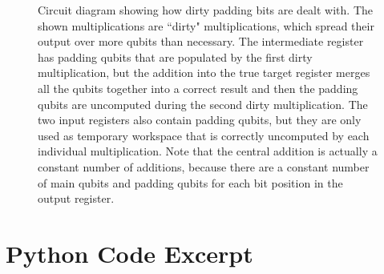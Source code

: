 \documentclass[onecolumn,unpublished]{quantumarticle}
\begin{document}
\begin{figure}
\centering
{}
    \caption{
        Circuit diagram showing how dirty padding bits are dealt with.
        The shown multiplications are ``dirty" multiplications, which spread their output over more qubits than necessary.
        The intermediate register has padding qubits that are populated by the first dirty multiplication, but the addition into the true target register merges all the qubits together into a correct result and then the padding qubits are uncomputed during the second dirty multiplication.
        The two input registers also contain padding qubits, but they are only used as temporary workspace that is correctly uncomputed by each individual multiplication.
        Note that the central addition is actually a constant number of additions, because there are a constant number of main qubits and padding qubits for each bit position in the output register.
    }
    \label{fig:padding}
\end{figure}

\section{Python Code Excerpt}
\label{app:python}
\end{document}
